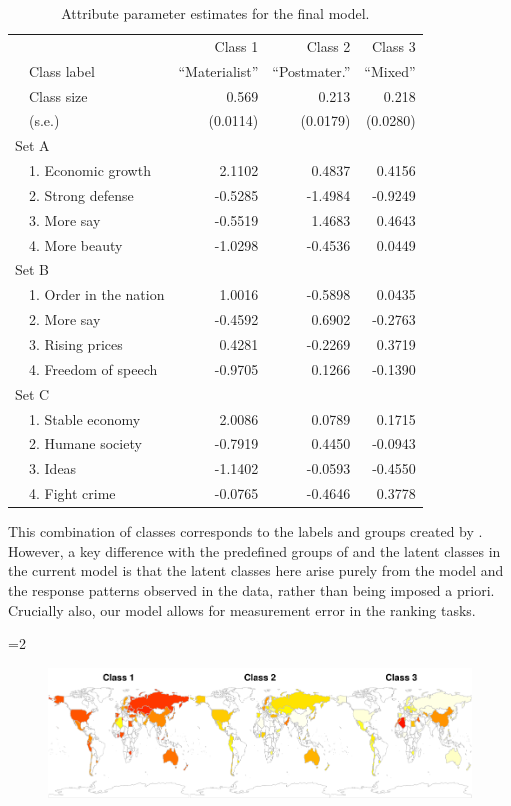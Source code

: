 \documentclass[letterpaper,12pt]{article}
\begin{document}
\begin{table}\centering
	\begin{tabular}{llrrr}
	\hline
			&&	Class 1	&	Class 2	&	Class 3\\
			&Class label& ``Materialist'' & ``Postmater.'' & ``Mixed''\\
& Class size & 0.569 & 0.213 & 0.218\\
& (s.e.)				& (0.0114)	&	(0.0179)	&	(0.0280)\\
				\hline
\multicolumn{3}{l}{Set A}\\
& 1. Economic growth	&	2.1102	&	0.4837	&	0.4156\\
& 2. Strong defense	&	-0.5285	&	-1.4984	&	-0.9249\\
& 3. More say	&	-0.5519	&	1.4683	&	0.4643\\
& 4. More beauty	&	-1.0298	&	-0.4536	&	0.0449\\
\multicolumn{3}{l}{Set B}\\
& 1. Order in the nation	&	1.0016	&	-0.5898	&	0.0435\\
& 2. More say	&	-0.4592	&	0.6902	&	-0.2763\\
& 3. Rising prices	&	0.4281	&	-0.2269	&	0.3719\\
& 4. Freedom of speech	&	-0.9705	&	0.1266	&	-0.1390\\
\multicolumn{3}{l}{Set C}\\
& 1. Stable economy	&	2.0086	&	0.0789	&	0.1715\\
& 2. Humane society	&	-0.7919	&	0.4450	&	-0.0943\\
& 3. Ideas	&	-1.1402	&	-0.0593	&	-0.4550\\
& 4. Fight crime	&	-0.0765	&	-0.4646	&	0.3778\\
	\hline
	\end{tabular}
	\caption{\label{tab:attribute-parameters}Attribute parameter estimates for the 
		final model.}
\end{table}

This combination of classes corresponds to the labels and groups created  by \citet{inglehart1997modernization}. However, a key difference with the predefined groups of  \citet{inglehart1997modernization}  and the latent classes in the current model is that the latent classes here arise purely from the model and the response patterns observed in the data, rather than being imposed a priori. Crucially also, our model allows for measurement error in the ranking tasks. 

=2
\begin{figure}
	\includegraphics[width=\textwidth]{figures/maps.pdf}
	
	\caption{\label{fig:maps}}
\end{figure}
\end{document}
